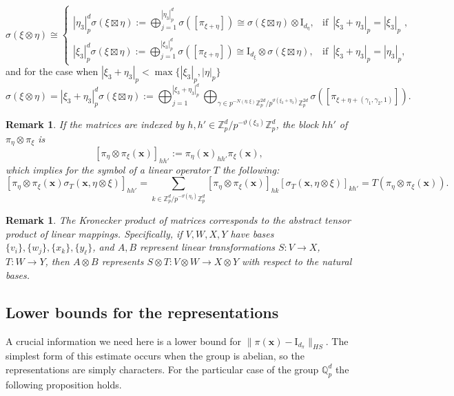 \documentclass[12pt, reqno]{amsart}
\newtheorem{rem}[defi]{Remark}
\newcommand{\Q}{\mathbb{Q}}
\newcommand{\1}{\mathds{1}}
\begin{document}
\[
 \sigma( \xi \otimes \eta ) \cong 
\begin{cases}
|\eta_3|_p^d \sigma( \xi \boxtimes \eta) :=  \bigoplus_{j=1}^{| \eta_3 |_p^d}  \sigma([\pi_{\xi + \eta } ]) \cong \sigma(\xi \boxtimes \eta) \otimes  \mathrm{I}_{d_\eta} , & \text{if } \, |\xi_3 + \eta_3|_p = |\xi_3|_p \, \,, \\
|\xi_3|_p^d \sigma(\xi \boxtimes \eta ) := \bigoplus_{j=1}^{| \xi_3 |_p^d}  \sigma ([\pi_{\xi + \eta } ]) \cong  \mathrm{I}_{d_\xi} \otimes \sigma(\xi \boxtimes \eta )  , & \text{if } \, |\xi_3 + \eta_3|_p = |\eta_3|_p ,
\end{cases}
\]and for the case when $| \xi_3 + \eta_3|_p < \max \{|\xi_3|_p, | \eta |_p \} $    
$$\sigma(\xi \otimes \eta ) = |\xi_3 + \eta_3|_p^d \sigma(\xi \boxtimes \eta) := \bigoplus_{j=1}^{| \xi_3 + \eta_3 |_p^d} \bigoplus_{\gamma \in p^{-N(\eta, \xi)} \mathbb{Z}_p^{2d} / p^{\vartheta(\xi_3+\eta_3)} \mathbb{Z}_p^{2d}}  \sigma([\pi_{\xi +  \eta + (\gamma_1 , \gamma_2, 1)}]). $$




\begin{rem}
If the matrices are indexed by $h,h' \in \mathbb{Z}_p^d / p^{-\vartheta(\xi_3)}\mathbb{Z}_p^d$, the block $hh'$ of $\pi_\eta \otimes \pi_\xi$ is
\[
[\pi_\eta \otimes \pi_\xi(\mathbf{x})]_{hh'} := \pi_\eta(\mathbf{x})_{hh'} \pi_\xi(\mathbf{x}),
\]
which implies for the symbol of a linear operator $T$ the following: 
\[
[\pi_\eta \otimes \pi_\xi(\mathbf{x})\sigma_T(\mathbf{x},\eta \otimes \xi)]_{hh'} = \sum_{k \in \mathbb{Z}_p^d /  p^{- \vartheta(\eta_3)}\mathbb{Z}_p^d} [\pi_\eta \otimes \pi_\xi(\mathbf{x})]_{hk} [\sigma_T(\mathbf{x},\eta \otimes \xi)]_{kh'} = T(\pi_\eta \otimes \pi_\xi(\mathbf{x})).
\]
\end{rem}

\begin{rem}
The Kronecker product of matrices corresponds to the abstract tensor product of linear mappings. Specifically, if $V,W,X,Y$ have bases $\{v_i\}, \{w_j\}, \{x_k\}, \{y_\ell\}$, and $A,B$ represent linear transformations $S: V\to X$, $T: W\to Y$, then $A\otimes B$ represents $S\otimes T : V\otimes W \to X \otimes Y$ with respect to the natural bases.
\end{rem}


\subsection{Lower bounds for the representations} A crucial information we need here is a lower bound for $\| \pi (\mathbf{x}) - \mathrm{I}_{d_\pi}\|_{HS}$. The simplest form of this estimate occurs when the group is abelian, so the representations are simply characters. For the particular case of the group $\Q_p^d$ the following proposition holds.   
\end{document}
